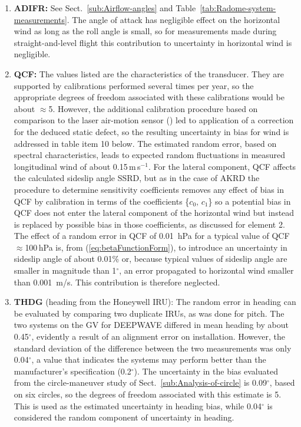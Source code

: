 \documentclass[12pt,twoside,english]{article}\usepackage[]{graphicx}\usepackage[]{color}
\let\OrgIndex\index
\renewcommand*{\index}[1]{\OrgIndex{#1}}
\begin{document}
\begin{enumerate}
\item \textbf{ADIFR: }
See Sect.~\ref{sub:Airflow-angles} and Table~\ref{tab:Radome-system-measurements}. The angle of attack has negligible effect on the horizontal wind as long as the roll angle is small, so for measurements made during straight-and-level flight this contribution to uncertainty in horizontal wind is negligible.  
\item \textbf{QCF:} 
The values listed are the characteristics of the transducer. They are supported by calibrations performed several times per year, so the appropriate degrees of freedom associated with these calibrations would be about $\approx$5. However, the additional calibration procedure based on comparison to the laser air-motion sensor (\citet{CooperEtAl2014}) led to application of a correction for the deduced static defect, so the resulting uncertainty in bias for wind is addressed in table item 10 below. The estimated random error, based on spectral characteristics, leads to expected random fluctuations in measured longitudinal wind of about 0.15\,m\,s$^{-1}$.
For the lateral component, QCF affects the calculated sideslip angle SSRD, but as in the case of AKRD the procedure to determine sensitivity coefficients removes any effect of bias in QCF by calibration in terms of the coefficients \{$c_{0},\,c_{1}$\} so a potential bias in QCF does not enter the lateral component of the horizontal wind but instead is replaced by possible bias in those coefficients, as discussed for element 2. The effect of a random error in QCF of 0.01~hPa for a typical value of QCF$\approx$100\,hPa is, from (\ref{eq:betaFunctionForm}), to introduce an uncertainty in sideslip angle of about 0.01\% or, because typical values of sideslip angle are smaller in magnitude than 1$^{\circ}$, an error propagated to horizontal wind smaller than 0.001~m/s. This contribution is therefore neglected.  
\item \textbf{THDG} (heading from the Honeywell IRU):
The random error in heading can be evaluated by comparing two duplicate IRUs, as was done for pitch. The two systems on the GV for DEEPWAVE differed in mean heading by about 0.45$^{\circ}$, evidently a result of an alignment error on installation. However, the standard deviation of the difference between the two measurements was only 0.04$^{\circ}$, a value that indicates the systems may perform better than the manufacturer's specification (0.2$^{\circ}$). The uncertainty in the bias evaluated from the circle-maneuver study of Sect.~\ref{sub:Analysis-of-circle} is 0.09$^{\circ}$, based on six circles, so the degrees of freedom associated with this estimate is 5. This is used as the estimated uncertainty in heading bias, while 0.04$^{\circ}$ is considered the random component of uncertainty in heading.  

\end{enumerate}
\end{document}
